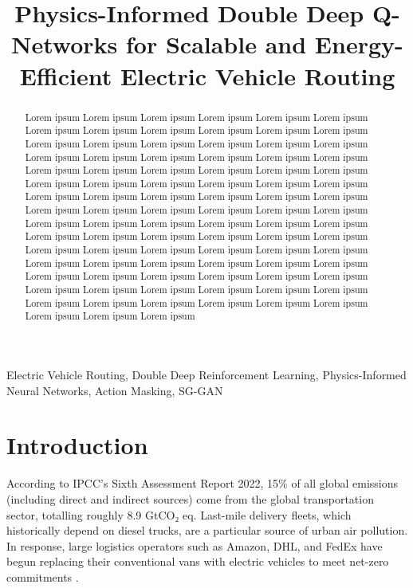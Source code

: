 \documentclass[conference]{IEEEtran}
\begin{document}
\title{Physics-Informed Double Deep Q-Networks for Scalable and Energy-Efficient Electric Vehicle Routing}

\author{
}

\maketitle

\begin{abstract}
Lorem ipsum Lorem ipsum Lorem ipsum Lorem ipsum Lorem ipsum Lorem ipsum Lorem ipsum Lorem ipsum Lorem ipsum Lorem ipsum Lorem ipsum Lorem ipsum Lorem ipsum Lorem ipsum Lorem ipsum Lorem ipsum Lorem ipsum Lorem ipsum Lorem ipsum Lorem ipsum Lorem ipsum Lorem ipsum Lorem ipsum Lorem ipsum Lorem ipsum Lorem ipsum Lorem ipsum Lorem ipsum Lorem ipsum Lorem ipsum Lorem ipsum Lorem ipsum Lorem ipsum Lorem ipsum Lorem ipsum Lorem ipsum Lorem ipsum Lorem ipsum Lorem ipsum Lorem ipsum Lorem ipsum Lorem ipsum Lorem ipsum Lorem ipsum Lorem ipsum Lorem ipsum Lorem ipsum Lorem ipsum Lorem ipsum Lorem ipsum Lorem ipsum Lorem ipsum Lorem ipsum Lorem ipsum Lorem ipsum Lorem ipsum Lorem ipsum Lorem ipsum Lorem ipsum Lorem ipsum Lorem ipsum Lorem ipsum Lorem ipsum Lorem ipsum Lorem ipsum Lorem ipsum Lorem ipsum Lorem ipsum Lorem ipsum Lorem ipsum Lorem ipsum Lorem ipsum Lorem ipsum Lorem ipsum Lorem ipsum Lorem ipsum Lorem ipsum Lorem ipsum Lorem ipsum Lorem ipsum Lorem ipsum Lorem ipsum Lorem ipsum Lorem ipsum Lorem ipsum Lorem ipsum Lorem ipsum Lorem ipsum Lorem ipsum Lorem ipsum Lorem ipsum Lorem ipsum Lorem ipsum 
\end{abstract}

\begin{IEEEkeywords}
Electric Vehicle Routing, Double Deep Reinforcement Learning, Physics-Informed Neural Networks, Action Masking, SG-GAN
\end{IEEEkeywords}

\section{Introduction}


According to IPCC's Sixth Assessment Report 2022, 15\% of all global emissions (including direct and indirect sources) come from the global transportation sector, totalling roughly 8.9 GtCO₂ eq. Last-mile delivery fleets, which historically depend on diesel trucks, are a particular source of urban air pollution. In response, large logistics operators such as Amazon, DHL, and FedEx have begun replacing their conventional vans with electric vehicles to meet net-zero commitments \cite{b1}.
\end{document}
